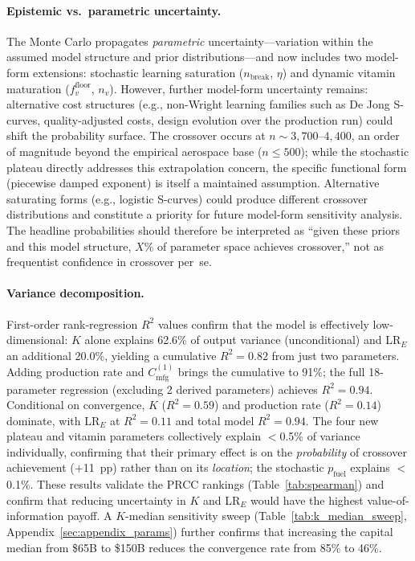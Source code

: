 \documentclass[preprint,12pt]{elsarticle}
\begin{document}
\paragraph{Epistemic vs.\ parametric uncertainty.} The Monte Carlo propagates \emph{parametric} uncertainty---variation within the assumed model structure and prior distributions---and now includes two model-form extensions: stochastic learning saturation ($n_{\mathrm{break}}$, $\eta$) and dynamic vitamin maturation ($f_v^{\mathrm{floor}}$, $n_v$). However, further model-form uncertainty remains: alternative cost structures (e.g., non-Wright learning families such as De Jong S-curves, quality-adjusted costs, design evolution over the production run) could shift the probability surface. The crossover occurs at $n \sim 3{,}700$--$4{,}400$, an order of magnitude beyond the empirical aerospace base ($n \leq 500$); while the stochastic plateau directly addresses this extrapolation concern, the specific functional form (piecewise damped exponent) is itself a maintained assumption. Alternative saturating forms (e.g., logistic S-curves) could produce different crossover distributions and constitute a priority for future model-form sensitivity analysis. The headline probabilities should therefore be interpreted as ``given these priors and this model structure, $X$\% of parameter space achieves crossover,'' not as frequentist confidence in crossover per~se.

\paragraph{Variance decomposition.}
\label{sec:sobol}
First-order rank-regression $R^2$ values confirm that the model is effectively low-dimensional: $K$ alone explains 62.6\% of output variance (unconditional) and LR$_E$ an additional 20.0\%, yielding a cumulative $R^2 = 0.82$ from just two parameters. Adding production rate and $C_{\mathrm{mfg}}^{(1)}$ brings the cumulative to 91\%; the full 18-parameter regression (excluding 2 derived parameters) achieves $R^2 = 0.94$. Conditional on convergence, $K$ ($R^2 = 0.59$) and production rate ($R^2 = 0.14$) dominate, with LR$_E$ at $R^2 = 0.11$ and total model $R^2 = 0.94$. The four new plateau and vitamin parameters collectively explain $<$0.5\% of variance individually, confirming that their primary effect is on the \emph{probability} of crossover achievement ($+$11~pp) rather than on its \emph{location}; the stochastic $p_{\mathrm{fuel}}$ explains $<$0.1\%. These results validate the PRCC rankings (Table~\ref{tab:spearman}) and confirm that reducing uncertainty in $K$ and LR$_E$ would have the highest value-of-information payoff. A $K$-median sensitivity sweep (Table~\ref{tab:k_median_sweep}, Appendix~\ref{sec:appendix_params}) further confirms that increasing the capital median from \$65B to \$150B reduces the convergence rate from 85\% to 46\%.
\end{document}
